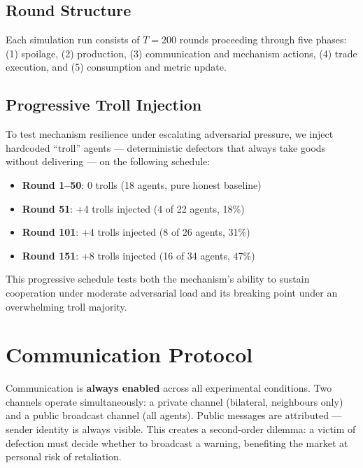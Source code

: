 \documentclass{article}
\begin{document}
\subsection{Round Structure}

Each simulation run consists of $T = 200$ rounds proceeding through five phases: (1) spoilage, (2) production, (3) communication and mechanism actions, (4) trade execution, and (5) consumption and metric update.

\subsection{Progressive Troll Injection}

To test mechanism resilience under escalating adversarial pressure, we inject hardcoded ``troll'' agents --- deterministic defectors that always take goods without delivering --- on the following schedule:

\begin{itemize}
  \item \textbf{Round 1--50}: 0 trolls (18 agents, pure honest baseline)
  \item \textbf{Round 51}: +4 trolls injected (4 of 22 agents, 18\%)
  \item \textbf{Round 101}: +4 trolls injected (8 of 26 agents, 31\%)
  \item \textbf{Round 151}: +8 trolls injected (16 of 34 agents, 47\%)
\end{itemize}

This progressive schedule tests both the mechanism's ability to sustain cooperation under moderate adversarial load and its breaking point under an overwhelming troll majority.

\section{Communication Protocol}
\label{sec:communication}

Communication is \textbf{always enabled} across all experimental conditions. Two channels operate simultaneously: a private channel (bilateral, neighbours only) and a public broadcast channel (all agents). Public messages are attributed --- sender identity is always visible. This creates a second-order dilemma: a victim of defection must decide whether to broadcast a warning, benefiting the market at personal risk of retaliation.
\end{document}
